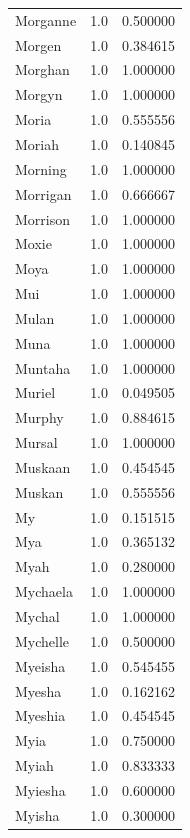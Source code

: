 \documentclass[
  letterpaper,
  DIV=11,
  numbers=noendperiod]{scrreprt}
\begin{document}
\begin{tabular}{lrr}
Morganne        &   1.0 &   0.500000 \\
Morgen          &   1.0 &   0.384615 \\
Morghan         &   1.0 &   1.000000 \\
Morgyn          &   1.0 &   1.000000 \\
Moria           &   1.0 &   0.555556 \\
Moriah          &   1.0 &   0.140845 \\
Morning         &   1.0 &   1.000000 \\
Morrigan        &   1.0 &   0.666667 \\
Morrison        &   1.0 &   1.000000 \\
Moxie           &   1.0 &   1.000000 \\
Moya            &   1.0 &   1.000000 \\
Mui             &   1.0 &   1.000000 \\
Mulan           &   1.0 &   1.000000 \\
Muna            &   1.0 &   1.000000 \\
Muntaha         &   1.0 &   1.000000 \\
Muriel          &   1.0 &   0.049505 \\
Murphy          &   1.0 &   0.884615 \\
Mursal          &   1.0 &   1.000000 \\
Muskaan         &   1.0 &   0.454545 \\
Muskan          &   1.0 &   0.555556 \\
My              &   1.0 &   0.151515 \\
Mya             &   1.0 &   0.365132 \\
Myah            &   1.0 &   0.280000 \\
Mychaela        &   1.0 &   1.000000 \\
Mychal          &   1.0 &   1.000000 \\
Mychelle        &   1.0 &   0.500000 \\
Myeisha         &   1.0 &   0.545455 \\
Myesha          &   1.0 &   0.162162 \\
Myeshia         &   1.0 &   0.454545 \\
Myia            &   1.0 &   0.750000 \\
Myiah           &   1.0 &   0.833333 \\
Myiesha         &   1.0 &   0.600000 \\
Myisha          &   1.0 &   0.300000 \\

\end{tabular}
\end{document}
